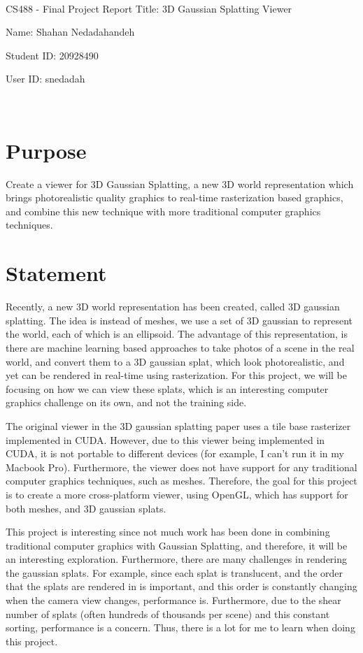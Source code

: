 \documentclass {article}
\begin{document}
~\vfill
\begin{center}
\Large

CS488 - Final Project Report
Title: 3D Gaussian Splatting Viewer

Name: Shahan Nedadahandeh

Student ID: 20928490

User ID: snedadah

\end{center}
\vfill ~\vfill~
\newpage
\section{Purpose}
     Create a viewer for 3D Gaussian Splatting, a new 3D world representation which brings photorealistic quality graphics to real-time rasterization based graphics, and combine this new technique with more traditional computer graphics techniques.

\section{Statement}
     Recently, a new 3D world representation has been created, called 3D gaussian splatting. The idea is instead of meshes, we use a set of 3D gaussian to represent the world, each of which is an ellipsoid. The advantage of this representation, is there are machine learning based approaches to take photos of a scene in the real world, and convert them to a 3D gaussian splat, which look photorealistic, and yet can be rendered in real-time using rasterization. For this project, we will be focusing on how we can view these splats, which is an interesting computer graphics challenge on its own, and not the training side.

     The original viewer in the 3D gaussian splatting paper uses a tile base rasterizer implemented in CUDA. However, due to this viewer being implemented in CUDA, it is not portable to different devices (for example, I can't run it in my Macbook Pro). Furthermore, the viewer does not have support for any traditional computer graphics techniques, such as meshes. Therefore, the goal for this project is to create a more cross-platform viewer, using OpenGL, which has support for both meshes, and 3D gaussian splats.
     
     This project is interesting since not much work has been done in combining traditional computer graphics with Gaussian Splatting, and therefore, it will be an interesting exploration. Furthermore, there are many challenges in rendering the gaussian splats. For example, since each splat is translucent, and the order that the splats are rendered in is important, and this order is constantly changing when the camera view changes, performance is. Furthermore, due to the shear number of splats (often hundreds of thousands per scene) and this constant sorting, performance is a concern. Thus, there is a lot for me to learn when doing this project.
\end{document}
